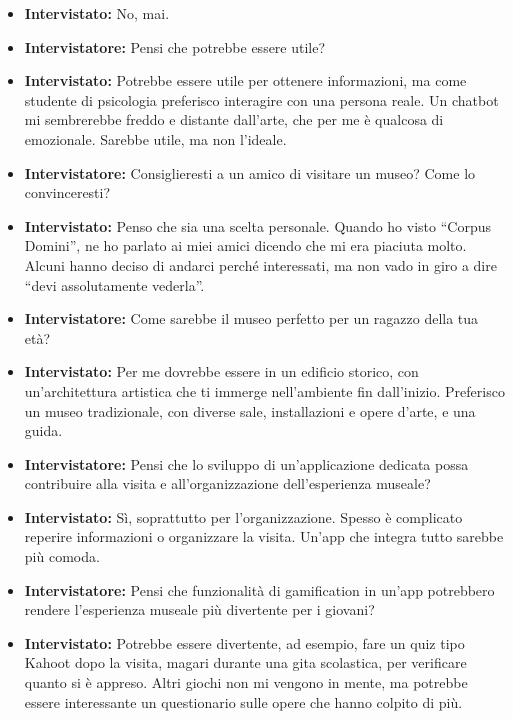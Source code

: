 \documentclass{article}
\begin{document}
\begin{itemize}
    \item \textbf{Intervistato:} No, mai.

    \item \textbf{Intervistatore:} Pensi che potrebbe essere utile?

    \item \textbf{Intervistato:} Potrebbe essere utile per ottenere informazioni, ma come studente di psicologia preferisco interagire con una persona reale. Un chatbot mi sembrerebbe freddo e distante dall’arte, che per me è qualcosa di emozionale. Sarebbe utile, ma non l’ideale.

    \item \textbf{Intervistatore:} Consiglieresti a un amico di visitare un museo? Come lo convinceresti?

    \item \textbf{Intervistato:} Penso che sia una scelta personale. Quando ho visto “Corpus Domini”, ne ho parlato ai miei amici dicendo che mi era piaciuta molto. Alcuni hanno deciso di andarci perché interessati, ma non vado in giro a dire “devi assolutamente vederla”.

    \item \textbf{Intervistatore:} Come sarebbe il museo perfetto per un ragazzo della tua età?

    \item \textbf{Intervistato:} Per me dovrebbe essere in un edificio storico, con un’architettura artistica che ti immerge nell’ambiente fin dall’inizio. Preferisco un museo tradizionale, con diverse sale, installazioni e opere d’arte, e una guida.

    \item \textbf{Intervistatore:} Pensi che lo sviluppo di un’applicazione dedicata possa contribuire alla visita e all’organizzazione dell’esperienza museale?

    \item \textbf{Intervistato:} Sì, soprattutto per l’organizzazione. Spesso è complicato reperire informazioni o organizzare la visita. Un’app che integra tutto sarebbe più comoda.

    \item \textbf{Intervistatore:} Pensi che funzionalità di gamification in un’app potrebbero rendere l’esperienza museale più divertente per i giovani?

    \item \textbf{Intervistato:} Potrebbe essere divertente, ad esempio, fare un quiz tipo Kahoot dopo la visita, magari durante una gita scolastica, per verificare quanto si è appreso. Altri giochi non mi vengono in mente, ma potrebbe essere interessante un questionario sulle opere che hanno colpito di più.


\end{itemize}
\end{document}
